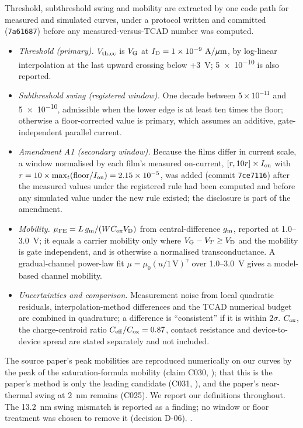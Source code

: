 Threshold, subthreshold swing and mobility are extracted by one code path for measured and simulated curves, under a
protocol written and committed (\texttt{7a61687}) before any measured-versus-TCAD number was computed. %
\begin{itemize}
\item \emph{Threshold (primary).} $V_{\mathrm{th,cc}}$ is $V_{\mathrm{G}}$ at $I_{\mathrm{D}} = \SI{1e-9}{\ensuremath{\,\mathrm{A}/\mu\mathrm{m}}}$, by log-linear interpolation at the
last upward crossing below +3~V; \SI{5e-10}{\Aum} is also reported. %
\item \emph{Subthreshold swing (registered window).} One decade between $5\times10^{-11}$ and \SI{5e-10}{\Aum},
admissible when the lower edge is at least ten times the floor; otherwise a floor-corrected value is primary, which
assumes an additive, gate-independent parallel current. %
\item \emph{Amendment A1 (secondary window).} Because the films differ in current scale, a window normalised by each
film's measured on-current, $[r, 10r]\times I_{\mathrm{on}}$ with $r = 10\times\max_t(\mathrm{floor}/I_{\mathrm{on}}) = 2.15\times10^{-5}$,
was added (commit \texttt{7ce7116}) after the measured values under the registered rule had been computed and before
any simulated value under the new rule existed; the disclosure is part of the amendment. %
\item \emph{Mobility.} $\mu_{\mathrm{FE}} = L\,g_{\mathrm{m}}/(WC_{\mathrm{ox}}V_{\mathrm{D}})$ from central-difference $g_{\mathrm{m}}$, reported at 1.0--3.0~V; it equals a
carrier mobility only where $V_{\mathrm{G}} - V_T \ge V_{\mathrm{D}}$ and the mobility is gate independent, and is otherwise a normalised
transconductance. A gradual-channel power-law fit $\mu = \mu_0 (u/1\,\mathrm{V})^\gamma$ over 1.0--3.0~V gives a
model-based channel mobility. %
\item \emph{Uncertainties and comparison.} Measurement noise from local quadratic residuals, interpolation-method
differences and the TCAD numerical budget are combined in quadrature; a difference is ``consistent'' if it is within
$2\sigma$. $C_{\mathrm{ox}}$, the charge-centroid ratio $C_{\mathrm{eff}}/C_{\mathrm{ox}} = 0.87$, contact resistance and device-to-device
spread are stated separately and not included. %
\end{itemize}
The source paper's peak mobilities are reproduced numerically on our curves by the peak of the saturation-formula
mobility (claim C030, ); that this is the paper's method is only the leading candidate (C031,
), and the paper's near-thermal swing at \SI{2}{nm} remains  (C025). We report our
definitions throughout. %
The \SI{13.2}{nm} swing mismatch is reported as a finding; no window or floor treatment was chosen to remove it
(decision D-06). %
.

